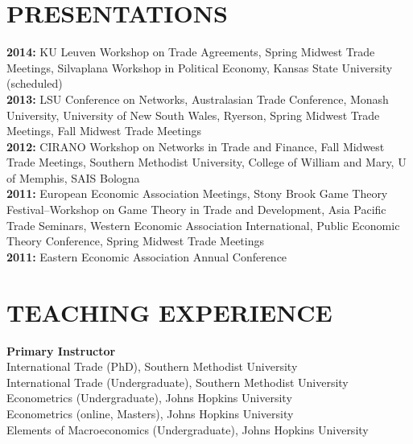 \documentclass[11pt]{res}
\begin{document}
\begin{resume}
\section{PRESENTATIONS}\vspace{2mm}
{\bf 2014:} KU Leuven Workshop on Trade Agreements, Spring Midwest Trade Meetings, Silvaplana Workshop in Political Economy, Kansas State University (scheduled)\vspace{2mm}\\
{\bf 2013:} LSU Conference on Networks, Australasian Trade Conference, Monash University, University of New South Wales, Ryerson, Spring Midwest Trade Meetings, Fall Midwest Trade Meetings\vspace{2mm}\\
{\bf 2012:}  CIRANO Workshop on Networks in Trade and Finance, Fall Midwest Trade Meetings, Southern Methodist University, College of William and Mary, U of Memphis, SAIS Bologna\vspace{2mm}\\
{\bf 2011:} European Economic Association Meetings, Stony Brook Game Theory Festival--Workshop on Game Theory in Trade and Development, Asia Pacific Trade Seminars, Western Economic Association International, Public Economic Theory Conference, Spring Midwest Trade Meetings\vspace{2mm}\\
 {\bf 2011:} Eastern Economic Association Annual Conference \vspace{2mm}\\


\section{TEACHING EXPERIENCE} \vspace{3mm}
{\bf Primary Instructor}\vspace{2mm}\\
International Trade (PhD), Southern Methodist University\vspace{1.5mm}\\
International Trade (Undergraduate), Southern Methodist University\vspace{1.5mm}\\
Econometrics (Undergraduate), Johns Hopkins University\vspace{1.5mm}\\
Econometrics (online, Masters), Johns Hopkins University\vspace{1.5mm}\\
Elements of Macroeconomics (Undergraduate), Johns Hopkins University\vspace{1.5mm}\\



\end{resume}
\end{document}
